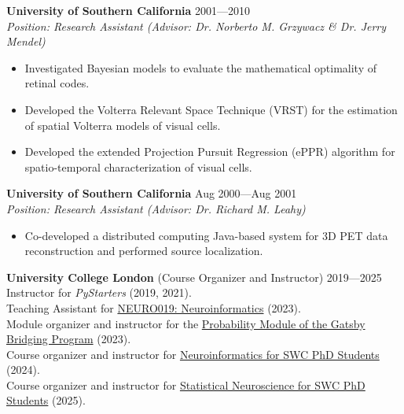 \documentclass[10pt]{article}
\newcommand{\sectionleft}[1]{\noindent\makebox[0pt][r]{\makebox[1.1in][l]{\textbf{#1}}\hspace{0.2in}}}
\begin{document}
\vspace{0.08in}

\sectionleft{}%
\textbf{University of Southern California} \hfill 2001---2010 \\
\sectionleft{}%
\textit{Position: Research Assistant (Advisor: Dr. Norberto M. Grzywacz \& Dr. Jerry Mendel)}
\begin{itemize}[leftmargin=1.5em, topsep=2pt, itemsep=1pt, parsep=1pt]
    \item Investigated Bayesian models to evaluate the mathematical optimality of retinal codes.
    \item Developed the Volterra Relevant Space Technique (VRST) for the
        estimation of spatial Volterra models of visual cells.
    \item Developed the extended Projection Pursuit Regression (ePPR) algorithm
        for spatio-temporal characterization of visual cells.
\end{itemize}

\vspace{0.05in}
\sectionleft{}%
\textbf{University of Southern California} \hfill Aug 2000---Aug 2001 \\
\sectionleft{}%
\textit{Position: Research Assistant (Advisor: Dr. Richard M. Leahy)} \vspace{-4pt}
\begin{itemize}[leftmargin=1.5em, topsep=2pt, itemsep=1pt, parsep=1pt]
    \item Co-developed a distributed computing Java-based system for 3D PET data reconstruction and performed source localization.
\end{itemize}

\vspace{0.15in}

\sectionleft{Teaching}%
\textbf{University College London} (Course Organizer and Instructor) \hfill 2019---2025 \\
\sectionleft{Experience}%
Instructor for \textit{PyStarters} (2019, 2021).\\
Teaching Assistant for \href{https://github.com/joacorapela/neuroinformatics23}{NEURO019: Neuroinformatics} (2023).\\
Module organizer and instructor for the \href{https://github.com/joacorapela/gcnuBridging2023}{Probability Module of the Gatsby Bridging Program} (2023). \\
Course organizer and instructor for \href{https://github.com/joacorapela/neuroinformatics24}{Neuroinformatics for SWC PhD Students} (2024). \\
Course organizer and instructor for \href{https://github.com/joacorapela/statNeuro2025}{Statistical Neuroscience for SWC PhD Students} (2025).
\end{document}
